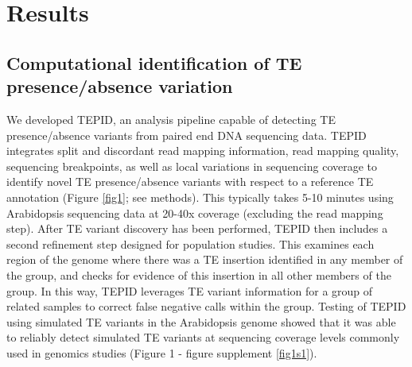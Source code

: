 \documentclass[12pt]{article}
\begin{document}
\section{Results}

\subsection{Computational identification of TE presence/absence variation}

We developed TEPID, an analysis pipeline capable of detecting TE
presence/absence variants from paired end DNA sequencing data. TEPID
integrates split and discordant read mapping information, read mapping
quality, sequencing breakpoints, as well as local variations in
sequencing coverage to identify novel TE presence/absence variants with
respect to a reference TE annotation (Figure \ref{fig1}; see methods). This
typically takes 5-10 minutes using Arabidopsis sequencing data at 20-40x
coverage (excluding the read mapping step). After TE variant discovery
has been performed, TEPID then includes a second refinement step
designed for population studies. This examines each region of the genome
where there was a TE insertion identified in any member of the group,
and checks for evidence of this insertion in all other members of the
group. In this way, TEPID leverages TE variant information for a group
of related samples to correct false negative calls within the group.
Testing of TEPID using simulated TE variants in the Arabidopsis genome
showed that it was able to reliably detect simulated TE variants at
sequencing coverage levels commonly used in genomics studies (Figure 1 -
figure supplement \ref{fig1s1}).
\end{document}

